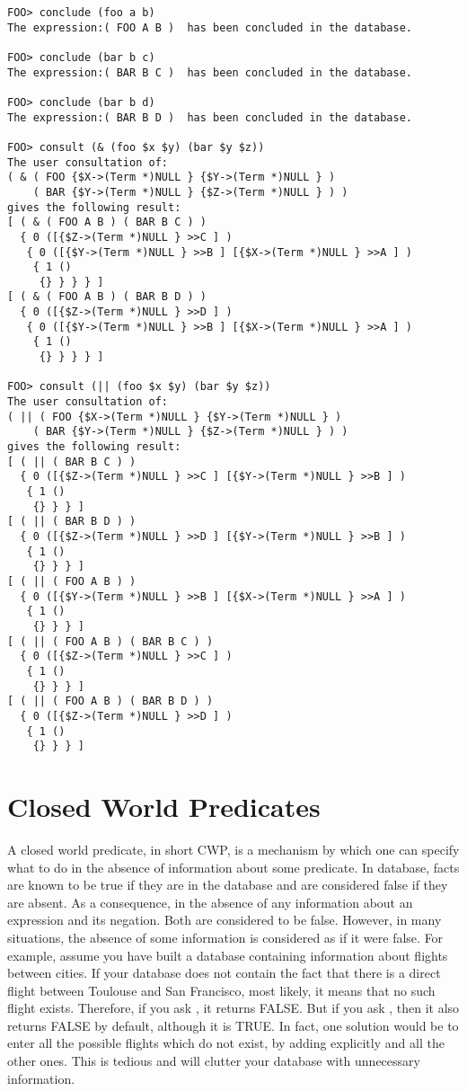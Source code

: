 \begin{verbatim}
FOO> conclude (foo a b)
The expression:( FOO A B )  has been concluded in the database.

FOO> conclude (bar b c)
The expression:( BAR B C )  has been concluded in the database.

FOO> conclude (bar b d)
The expression:( BAR B D )  has been concluded in the database.

FOO> consult (& (foo $x $y) (bar $y $z))
The user consultation of:
( & ( FOO {$X->(Term *)NULL } {$Y->(Term *)NULL } )
    ( BAR {$Y->(Term *)NULL } {$Z->(Term *)NULL } ) )
gives the following result:
[ ( & ( FOO A B ) ( BAR B C ) )
  { 0 ([{$Z->(Term *)NULL } >>C ] )
   { 0 ([{$Y->(Term *)NULL } >>B ] [{$X->(Term *)NULL } >>A ] )
    { 1 ()
     {} } } } ]
[ ( & ( FOO A B ) ( BAR B D ) )
  { 0 ([{$Z->(Term *)NULL } >>D ] )
   { 0 ([{$Y->(Term *)NULL } >>B ] [{$X->(Term *)NULL } >>A ] )
    { 1 ()
     {} } } } ]

FOO> consult (|| (foo $x $y) (bar $y $z))
The user consultation of:
( || ( FOO {$X->(Term *)NULL } {$Y->(Term *)NULL } )
    ( BAR {$Y->(Term *)NULL } {$Z->(Term *)NULL } ) )
gives the following result:
[ ( || ( BAR B C ) )
  { 0 ([{$Z->(Term *)NULL } >>C ] [{$Y->(Term *)NULL } >>B ] )
   { 1 ()
    {} } } ]
[ ( || ( BAR B D ) )
  { 0 ([{$Z->(Term *)NULL } >>D ] [{$Y->(Term *)NULL } >>B ] )
   { 1 ()
    {} } } ]
[ ( || ( FOO A B ) )
  { 0 ([{$Y->(Term *)NULL } >>B ] [{$X->(Term *)NULL } >>A ] )
   { 1 ()
    {} } } ]
[ ( || ( FOO A B ) ( BAR B C ) )
  { 0 ([{$Z->(Term *)NULL } >>C ] )
   { 1 ()
    {} } } ]
[ ( || ( FOO A B ) ( BAR B D ) )
  { 0 ([{$Z->(Term *)NULL } >>D ] )
   { 1 ()
    {} } } ]
\end{verbatim}

\section{Closed World Predicates}

A closed world predicate, in short CWP, is a mechanism by which one can
specify what to do in the absence of information about some predicate. In
\CPK{} database, facts are known to be true if they are in the database
and are considered false if they are absent. As a consequence, in the absence
of any information about an expression and its negation. Both are considered to
be false. However, in many situations, the absence of some information is
considered as if it were false. For example, assume you have built a database
containing information about flights between cities. If your database does not
contain the fact that there is a direct flight between Toulouse and San
Francisco, most likely, it means that no such flight exists. Therefore, if you
ask , it returns FALSE. But if you ask
, then it also returns FALSE by
default, although it is TRUE. In fact, one solution would be to enter all the
possible flights which do not exist, by adding explicitly  and all the other ones.  This is tedious and will
clutter your database with unnecessary information.

